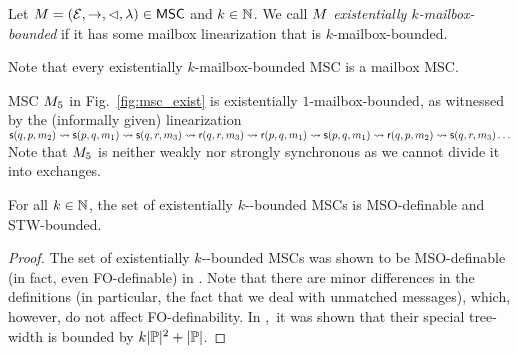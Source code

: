 \documentclass{article}
\begin{document}
\begin{definition}%
Let $M = (\mathcal{E},\to,\lhd,\lambda) \in \mathsf{MSC}$ and $k \in \mathbb{N}$.
We call $M$
\emph{existentially $k$-mailbox-bounded} if
it has some mailbox linearization that is $k$-mailbox-bounded.
\end{definition}

\noindent
\begin{minipage}[c]{10.5cm}
  Note that every existentially $k$-mailbox-bounded MSC is a mailbox MSC.
	\begin{example}
MSC $M_{5}$ in Fig.~\ref{fig:msc_exist}
is %
existentially $1$-mailbox-bounded, as witnessed by the (informally given)
linearization
$\mathsf{s}(q,p,m_2) \rightsquigarrow \mathsf{s}(p,q,m_1) \rightsquigarrow \mathsf{s}(q,r,m_3) \rightsquigarrow \mathsf{r}(q,r, m_3) \rightsquigarrow \mathsf{r}(p,q, m_1) \rightsquigarrow
  \mathsf{s}(p,q,m_1) \rightsquigarrow \mathsf{r}(q,p, m_2) \rightsquigarrow \mathsf{s}(q,r,m_3)
\ldots $
Note that $M_{5}$ is neither weakly nor strongly synchronous as we cannot divide it into exchanges.
	\end{example}
\end{minipage}
\begin{minipage}[c]{3.5cm}
	
\end{minipage}

\medskip

\begin{proposition}
\label{prop:exists-k-p2p-bounded}
For all $k \in \mathbb{N}$, the set of existentially $k$-\pp-bounded MSCs
is MSO-definable and STW-bounded.
\end{proposition}

\begin{proof}
The set of existentially $k$-\pp-bounded MSCs was shown to be MSO-definable
(in fact, even FO-definable) in \cite{DBLP:journals/iandc/LohreyM04}. Note that there are minor differences
in the definitions (in particular, the fact that we deal with unmatched messages),
which, however, do not affect FO-definability.
In \cite[Proposition 5.4, page 163]{DBLP:journals/corr/abs-1904-06942},\
it was shown that their special tree-width is bounded by $k|\mathbb{P}|^2 + |\mathbb{P}|$.
\end{proof}
\end{document}
